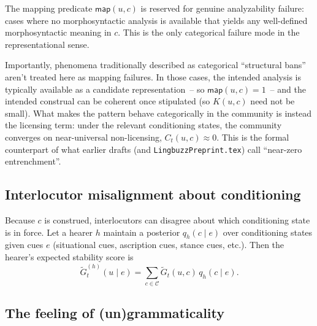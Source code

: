 \documentclass[12pt,letterpaper]{article}
\begin{document}
The mapping predicate $\mathsf{map}(u,c)$ is reserved for genuine
analyzability failure: cases where no morphosyntactic analysis is available that
yields any well-defined morphosyntactic meaning in $c$. This is the only
categorical failure mode in the representational sense.

Importantly, phenomena traditionally described as categorical \enquote{structural
bans} aren't treated here as mapping failures. In those cases, the intended
analysis is typically available as a candidate representation~-- so
$\mathsf{map}(u,c)=1$~-- and the intended construal can be coherent once
stipulated (so $K(u,c)$ need not be small). What makes the pattern behave
categorically in the community is instead the licensing term: under the relevant
conditioning states, the community converges on near-universal non-licensing,
$C_t(u,c)\approx 0$. This is the formal counterpart of what earlier drafts (and
\texttt{LingbuzzPreprint.tex}) call \enquote{near-zero entrenchment}.

\subsection{Interlocutor misalignment about conditioning}
\label{sec:misalignment-conditioning}

Because $c$ is construed, interlocutors can disagree about which conditioning state is
in force.  Let a hearer $h$ maintain a posterior $q_h(c\mid e)$ over conditioning states
given cues $e$ (situational cues, ascription cues, stance cues, etc.).  Then the hearer's
expected stability score is
\begin{equation*}
\widetilde{G}^{(h)}_t(u\mid e)=\sum_{c\in\mathcal{C}} \widetilde{G}_t(u,c)\,q_h(c\mid e).
\end{equation*}

\subsection{The feeling of (un)grammaticality}
\label{sec:feeling-new}
\end{document}
